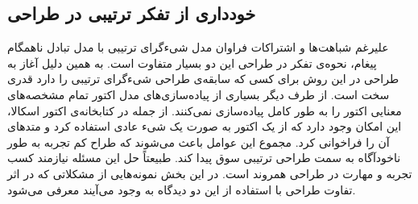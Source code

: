 \subsection{خودداری از تفکر ترتیبی در طراحی}
علیرغم شباهت‌ها و اشتراکات فراوان مدل شیءگرای ترتیبی با مدل تبادل ناهمگام پیغام، نحوه‌ی تفکر در طراحی این دو بسیار متفاوت است. به همین دلیل آغاز به طراحی در این روش برای کسی که سابقه‌ی طراحی شیءگرای ترتیبی را دارد قدری سخت است. از طرف دیگر بسیاری از پیاده‌سازی‌های مدل اکتور تمام مشخصه‌های معنایی اکتور را به طور کامل پیاده‌سازی نمی‌کنند\cite{ActorsJVM2009}. از جمله در کتابخانه‌ی اکتور اسکالا، این امکان وجود دارد که از یک اکتور به صورت یک شیء عادی استفاده کرد و متدهای آن را فراخوانی کرد. مجموع این عوامل باعث می‌شوند که طراح کم تجربه به طور ناخودآگاه به سمت طراحی ترتیبی سوق پیدا کند. طبیعتاً
حل این مسئله نیازمند کسب تجربه و مهارت در طراحی همروند است. در این بخش نمونه‌هایی از مشکلاتی که در اثر تفاوت طراحی با استفاده از این دو دیدگاه به وجود می‌آیند معرفی می‌شود.
